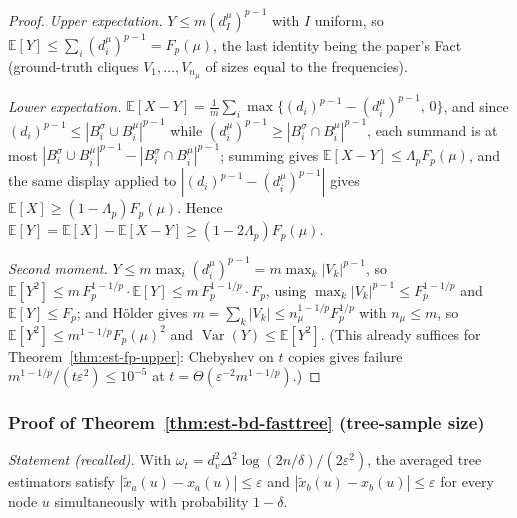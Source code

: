 \begin{proof}
\emph{Upper expectation.} $Y \le m(d_I^\mu)^{p-1}$ with $I$ uniform, so $\mathbb{E}[Y] \le
\sum_i (d_i^\mu)^{p-1} = F_p(\mu)$, the last identity being the paper's Fact (ground-truth
cliques $V_1,\dots,V_{n_\mu}$ of sizes equal to the frequencies).

\emph{Lower expectation.} $\mathbb{E}[X-Y] = \frac1m\sum_i \max\bigl\{(d_i)^{p-1} -
(d_i^\mu)^{p-1},\,0\bigr\}$, and since $(d_i)^{p-1} \le |B_i^\sigma\cup B_i^\mu|^{p-1}$ while
$(d_i^\mu)^{p-1} \ge |B_i^\sigma\cap B_i^\mu|^{p-1}$, each summand is at most
$|B_i^\sigma\cup B_i^\mu|^{p-1} - |B_i^\sigma\cap B_i^\mu|^{p-1}$; summing gives
$\mathbb{E}[X-Y] \le \Lambda_p F_p(\mu)$, and the same display applied to
$|(d_i)^{p-1} - (d_i^\mu)^{p-1}|$ gives $\mathbb{E}[X] \ge (1-\Lambda_p)F_p(\mu)$. Hence
$\mathbb{E}[Y] = \mathbb{E}[X] - \mathbb{E}[X-Y] \ge (1-2\Lambda_p)F_p(\mu)$.

\emph{Second moment.} $Y \le m\max_i (d_i^\mu)^{p-1} = m\max_k |V_k|^{p-1}$, so
$\mathbb{E}[Y^2] \le m\,F_p^{1-1/p}\cdot\mathbb{E}[Y] \le m\,F_p^{1-1/p}\cdot F_p$, using
$\max_k|V_k|^{p-1} \le F_p^{1-1/p}$ and $\mathbb{E}[Y] \le F_p$; and H\"older gives
$m = \sum_k |V_k| \le n_\mu^{1-1/p}F_p^{1/p}$ with $n_\mu \le m$, so $\mathbb{E}[Y^2] \le
m^{1-1/p}F_p(\mu)^2$ and $\operatorname{Var}(Y) \le \mathbb{E}[Y^2]$. (This already
suffices for Theorem~\ref{thm:est-fp-upper}: Chebyshev on $t$ copies gives failure
$m^{1-1/p}/(t\varepsilon^2) \le 10^{-5}$ at $t = \Theta(\varepsilon^{-2}m^{1-1/p})$.)
\end{proof}

\subsubsection*{Proof of Theorem~\ref{thm:est-bd-fasttree} (tree-sample size)}
{\itshape Statement (recalled).} With $\omega_t = d_v^2\Delta^2\log(2n/\delta)/(2\varepsilon^2)$,
the averaged tree estimators satisfy $|\tilde x_a(u) - x_a(u)| \le \varepsilon$ and
$|\tilde x_b(u) - x_b(u)| \le \varepsilon$ for every node $u$ simultaneously with probability
$1-\delta$.\eop


